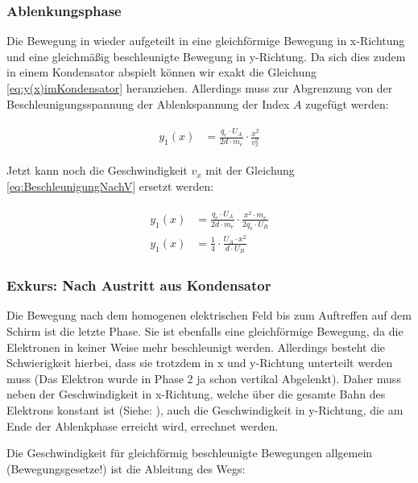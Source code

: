 \subsubsection{Ablenkungsphase}

Die Bewegung in wieder aufgeteilt in eine gleichförmige Bewegung in x-Richtung und eine gleichmäßig beschleunigte Bewegung in y-Richtung. Da sich dies zudem in einem Kondensator abspielt können wir exakt die Gleichung \ref{eq:y(x)imKondensator} heranziehen. Allerdings muss zur Abgrenzung von der Beschleunigungsspannung der Ablenkspannung der Index $A$ zugefügt werden:

\begin{align} \label{eq:y_1(x)Braun}
\begin{split}
	y_1(x) &= \frac{q_e \cdot U_A}{2d \cdot m_e} \cdot \frac{x^2}{v_{x}^2}
\end{split}
\end{align}

Jetzt kann noch die Geschwindigkeit $v_{x}$ mit der Gleichung \ref{eq:BeschleunigungNachV} ersetzt werden:

\begin{align} \label{eq:y_1(x)BraunMitV}
\begin{split}
	y_1(x) &= \frac{q_e \cdot U_A}{2d \cdot m_e} \cdot \frac{x^2 \cdot m_e}{2q_e \cdot U_B} \\
	y_1(x) &= \frac{1}{4} \cdot \frac{U_A \cdot x^2}{d \cdot U_B}
\end{split}
\end{align}


\subsubsection{Exkurs: Nach Austritt aus Kondensator}

Die Bewegung nach dem homogenen elektrischen Feld bis zum Auftreffen auf dem Schirm ist die letzte Phase. Sie ist ebenfalls eine gleichförmige Bewegung, da die Elektronen in keiner Weise mehr beschleunigt werden. Allerdings besteht die Schwierigkeit hierbei, dass sie trotzdem in x und y-Richtung unterteilt werden muss (Das Elektron wurde in Phase 2 ja schon vertikal Abgelenkt). Daher muss neben der Geschwindigkeit in x-Richtung, welche über die gesamte Bahn des Elektrons konstant ist (Siehe: ), auch die Geschwindigkeit in y-Richtung, die am Ende der Ablenkphase erreicht wird, errechnet werden. 

Die Geschwindigkeit für gleichförmig beschleunigte Bewegungen allgemein (Bewegungsgesetze!) ist die Ableitung des Wegs:

